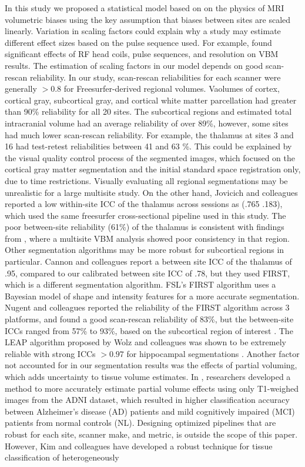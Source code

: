 In this study we proposed a statistical model based on on the physics of MRI volumetric biases using the key assumption that biases between sites are scaled linearly. Variation in scaling factors could explain why a study may estimate different effect sizes based on the pulse sequence used. For example, \cite{streitburger2014impact} found significant effects of RF head coils, pulse sequences, and resolution on VBM results. The estimation of scaling factors in our model depends on good scan-rescan reliability. In our study, scan-rescan reliabilities for each scanner were generally $>0.8$ for Freesurfer-derived regional volumes. Vaolumes of cortex, cortical gray, subcortical gray, and cortical white matter parcellation had greater than 90\% reliability for all 20 sites. The subcortical regions and estimated total intracranial volume had an average reliability of over 89\%, however, some sites had much lower scan-rescan reliability. For example, the thalamus at sites 3 and 16 had test-retest reliabilities between 41 and 63 \%. This could be explained by the visual quality control process of the segmented images, which focused on the cortical gray matter segmentation and the initial standard space registration only, due to time restrictions. Visually evaluating all regional segmentations may be unrealistic for a large multisite study. On the other hand, Jovicich and colleagues \cite{jovicich2013brain} reported a low within-site ICC of the thalamus across sessions as (.765 \pm .183), which used the same freesurfer cross-sectional pipeline used in this study. The poor between-site reliability (61\%) of the thalamus is consistent with findings from \cite{schnack2010mapping}, where a multisite VBM analysis showed poor consistency in that region. Other segmentation algorithms may be more robust for subcortical regions in particular.  Cannon and colleagues \cite{cannon2014} report a between site ICC of the thalamus of .95, compared to our calibrated between site ICC of .78, but they used FIRST, which is a different segmentation algorithm. FSL's FIRST algorithm \cite{firstcitation} uses a Bayesian model of shape and intensity features for a more accurate segmentation. Nugent and colleagues reported the reliability of the FIRST algorithm across 3 platforms, and found a good scan-rescan reliability of 83\%, but the between-site ICCs ranged from 57\% to 93\%, based on the subcortical region of interest \cite{firstreliability}. The LEAP algorithm proposed by Wolz and colleagues \cite{Wolz_2010} was shown to be extremely reliable with strong ICCs $>0.97$ for hippocampal segmentations \cite{Wolz_2014}. Another factor not accounted for in our segmentation results was the effects of partial voluming, which adds uncertainty to tissue volume estimates. In \cite{Roche_2014}, researchers developed a method to more accurately estimate partial volume effects using only T1-weighed images from the ADNI dataset, which resulted in higher classification accuracy between Alzheimer's disease (AD) patients and mild cognitively impaired (MCI) patients from normal controls (NL). Designing optimized pipelines that are robust for each site, scanner make, and metric, is outside the scope of this paper. However, Kim and colleagues have developed a robust technique for tissue classification of heterogeneously 
